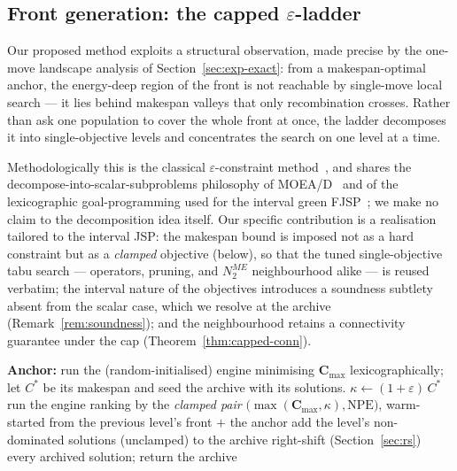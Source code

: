 \documentclass[preprint,12pt]{elsarticle}
\newcommand{\NPE}{\mathrm{NPE}}
\begin{document}
\subsection{Front generation: the capped $\varepsilon$-ladder}
\label{sec:pareto}

Our proposed method exploits a structural observation, made precise by the
one-move landscape analysis of Section~\ref{sec:exp-exact}: from a
makespan-optimal anchor, the energy-deep region of the front is not
reachable by single-move local search --- it lies behind makespan valleys
that only recombination crosses. Rather than ask one population to cover
the whole front at once, the ladder decomposes it into single-objective
levels and concentrates the search on one level at a time.

Methodologically this is the classical $\varepsilon$-constraint
method~\cite{Haimes1971}, and shares the decompose-into-scalar-subproblems
philosophy of MOEA/D~\cite{ZhangLi2007} and of the lexicographic
goal-programming used for the interval green FJSP~\cite{Afsar2024,Afsar2025};
we make no claim to the decomposition idea itself. Our specific contribution
is a realisation tailored to the interval JSP: the makespan bound is imposed
not as a hard constraint but as a \emph{clamped} objective (below), so that
the tuned single-objective tabu search --- operators, pruning, and $N_2^{ME}$
neighbourhood alike --- is reused verbatim; the interval nature of the
objectives introduces a soundness subtlety absent from the scalar case, which
we resolve at the archive (Remark~\ref{rem:soundness}); and the neighbourhood
retains a connectivity guarantee under the cap
(Theorem~\ref{thm:capped-conn}).

\begin{algorithm}[H]
\caption{Capped $\varepsilon$-ladder (per run).}
\begin{algorithmic}[1]
\State \textbf{Anchor:} run the (random-initialised) engine minimising
$\mathbf{C}_{\max}$ lexicographically; let $C^{*}$ be its makespan and seed
the archive with its solutions.
  \State $\kappa \gets (1+\varepsilon)\,C^{*}$ 
  \State run the engine ranking by the \emph{clamped pair}
  $\bigl(\max(\mathbf{C}_{\max},\kappa),\mathbf{\NPE}\bigr)$, warm-started
  from the previous level's front $+$ the anchor
  \State add the level's non-dominated solutions (unclamped) to the archive
\EndFor
\State right-shift (Section~\ref{sec:rs}) every archived solution; return
the archive
\end{algorithmic}
\end{algorithm}
\end{document}
